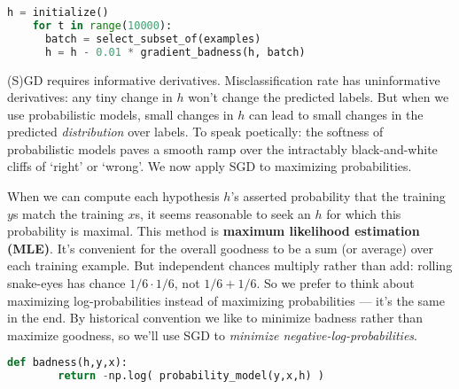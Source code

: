   \begin{lstlisting}[language=Python, basicstyle=\footnotesize\ttfamily]
    h = initialize()
    for t in range(10000):
      batch = select_subset_of(examples)
      h = h - 0.01 * gradient_badness(h, batch)
  \end{lstlisting}
  \begin{marginfigure}[-0cm]
    \centering
    \caption{%
      An intuitive picture of gradient descent.  Vertical axis is training loss
      and the other two axes are weight-space.
      Warning: though logistic loss (and the L2 regularizer) is smooth,
      perceptron and hinge loss (and the L1 regularizer) have jagged angles or
      `joints'.  Also, all five of those functions are convex.
      The smooth, nonconvex picture here is most apt for deep learning (Unit
      3).
    }
  \end{marginfigure}

  (S)GD requires informative derivatives.  Misclassification rate has
  uninformative derivatives: any tiny change in $h$ won't change the predicted
  labels.  But when we use probabilistic models, small changes in $h$ can lead
  to small changes in the predicted \emph{distribution} over labels.
  To speak poetically: the softness of probabilistic models paves a smooth ramp
  over the intractably black-and-white cliffs of `right' or `wrong'.
  We now apply SGD to maximizing probabilities.

  When we can compute each hypothesis $h$'s asserted probability
  that the training $y$s match the training $x$s, it seems
  reasonable to seek an $h$ for which this probability is maximal.  This
  method is \textbf{maximum likelihood estimation (MLE)}.
  It's convenient for the overall goodness to be a sum (or average) over each
  training example.  But independent chances multiply rather than add:
  rolling snake-eyes has chance $1\!/\!6 \cdot 1\!/\!6$, not $1\!/\!6 + 1\!/\!6$.  So
  we prefer to think about maximizing log-probabilities instead of maximizing
  probabilities --- it's the same in the end.
  By historical
  convention we like to minimize badness rather than maximize goodness, so
  we'll use SGD to \emph{minimize negative-log-probabilities}.
  \begin{lstlisting}[language=Python, basicstyle=\footnotesize\ttfamily]
    def badness(h,y,x):
        return -np.log( probability_model(y,x,h) )
  \end{lstlisting}

